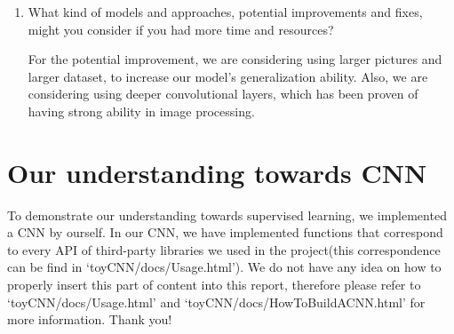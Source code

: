 \documentclass[letter]{article}
\begin{document}
\begin{itemize}
\begin{enumerate}
\begin{itemize}
		\end{itemize}
		\item {What kind of models and approaches, potential improvements and fixes, might you consider if you had more
			time and resources?}
		\par{For the potential improvement, we are considering using larger pictures and larger dataset, to increase our model's generalization ability. Also, we are considering using deeper convolutional layers, which has been proven of having strong ability in image processing.}
	\end{enumerate}
\end{itemize}

\section{Our understanding towards CNN}
\par{To demonstrate our understanding towards supervised learning, we implemented a CNN by ourself. In our CNN, we have implemented functions that correspond to every API of third-party libraries we used in the project(this correspondence can be find in `toyCNN/docs/Usage.html'). We do not have any idea on how to properly insert this part of content into this report, therefore please refer to `toyCNN/docs/Usage.html' and `toyCNN/docs/HowToBuildACNN.html' for more information. Thank you!}
\end{document}
